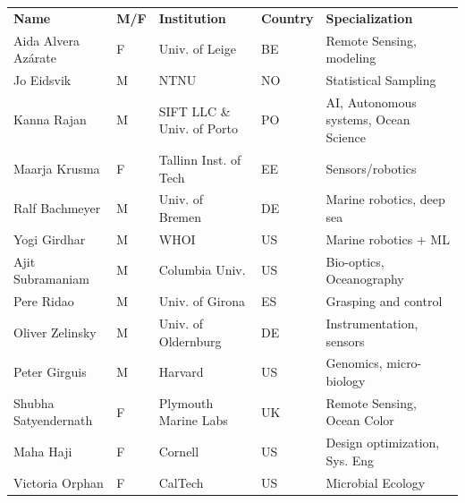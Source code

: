 \begin{table}[H]
  \footnotesize{
\begin{tabular}{|p{3cm}|p{0.7cm}|p{4.0cm}|p{0.5cm}|p{6.5cm}|}
  \rowcolor{Gray}
  \bfseries Name& \bfseries M/F&\bfseries Institution & \bfseries Country& \bfseries Specialization\\
Aida Alvera Az\'{a}rate    & F   & Univ. of Leige                        & BE       & Remote Sensing, modeling                        \\
\hline
Jo Eidsvik               & M   & NTNU                                  & NO       & Statistical Sampling                            \\
\hline
Kanna Rajan              & M   & SIFT LLC \& Univ. of Porto            & PO       & AI, Autonomous systems, Ocean Science           \\
 \hline
Maarja Krusma            & F   & Tallinn Inst. of Tech                 & EE  & Sensors/robotics                                \\
  \hline
Ralf Bachmeyer           & M   & Univ. of Bremen                       & DE       & Marine robotics, deep sea                       \\
\hline
Yogi Girdhar             & M   & WHOI                                  & US       & Marine robotics + ML                            \\
\hline
Ajit Subramaniam         & M   & Columbia Univ.                        & US       & Bio-optics, Oceanography                        \\
\hline
Pere Ridao               & M   & Univ. of Girona                       & ES       & Grasping and control                            \\
\hline
Oliver Zelinsky          & M   & Univ. of Oldernburg                   & DE       & Instrumentation, sensors                        \\
\hline
Peter Girguis            & M   & Harvard                               & US       & Genomics, micro-biology                         \\
\hline
Shubha Satyendernath     & F   & Plymouth Marine Labs                  & UK       & Remote Sensing, Ocean Color                     \\
\hline
Maha Haji                & F   & Cornell                               & US       & Design optimization, Sys. Eng                   \\
\hline
Victoria Orphan          & F   & CalTech                               & US       & Microbial Ecology                               \\

\end{tabular}}
\end{table}
